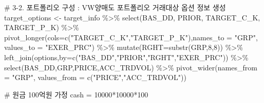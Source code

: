 \documentclass[
  a4paper,
  DIV=11,
  numbers=noendperiod]{scrreprt}
\newenvironment{Shaded}{\begin{snugshade}}{\end{snugshade}}
\newcommand{\AttributeTok}[1]{\textcolor[rgb]{0.40,0.45,0.13}{#1}}
\newcommand{\CommentTok}[1]{\textcolor[rgb]{0.37,0.37,0.37}{#1}}
\newcommand{\DecValTok}[1]{\textcolor[rgb]{0.68,0.00,0.00}{#1}}
\newcommand{\FunctionTok}[1]{\textcolor[rgb]{0.28,0.35,0.67}{#1}}
\newcommand{\NormalTok}[1]{\textcolor[rgb]{0.00,0.23,0.31}{#1}}
\newcommand{\OtherTok}[1]{\textcolor[rgb]{0.00,0.23,0.31}{#1}}
\newcommand{\SpecialCharTok}[1]{\textcolor[rgb]{0.37,0.37,0.37}{#1}}
\newcommand{\StringTok}[1]{\textcolor[rgb]{0.13,0.47,0.30}{#1}}
\begin{document}
\begin{Shaded}
\begin{Highlighting}[]
\CommentTok{\# 3{-}2. 포트폴리오 구성 : VW양매도 포트폴리오 거래대상 옵션 정보 생성}
\NormalTok{target\_options }\OtherTok{\textless{}{-}}\NormalTok{ target\_info }\SpecialCharTok{\%\textgreater{}\%} 
  \FunctionTok{select}\NormalTok{(BAS\_DD, PRIOR, TARGET\_C\_K, TARGET\_P\_K) }\SpecialCharTok{\%\textgreater{}\%} 
  \FunctionTok{pivot\_longer}\NormalTok{(}\AttributeTok{cols=}\FunctionTok{c}\NormalTok{(}\StringTok{"TARGET\_C\_K"}\NormalTok{,}\StringTok{"TARGET\_P\_K"}\NormalTok{),}\AttributeTok{names\_to =} \StringTok{"GRP"}\NormalTok{, }\AttributeTok{values\_to =} \StringTok{"EXER\_PRC"}\NormalTok{) }\SpecialCharTok{\%\textgreater{}\%} 
  \FunctionTok{mutate}\NormalTok{(}\AttributeTok{RGHT=}\FunctionTok{substr}\NormalTok{(GRP,}\DecValTok{8}\NormalTok{,}\DecValTok{8}\NormalTok{)) }\SpecialCharTok{\%\textgreater{}\%} 
  \FunctionTok{left\_join}\NormalTok{(options,}\AttributeTok{by=}\FunctionTok{c}\NormalTok{(}\StringTok{"BAS\_DD"}\NormalTok{,}\StringTok{"PRIOR"}\NormalTok{,}\StringTok{"RGHT"}\NormalTok{,}\StringTok{"EXER\_PRC"}\NormalTok{)) }\SpecialCharTok{\%\textgreater{}\%}
  \FunctionTok{select}\NormalTok{(BAS\_DD,GRP,PRICE,ACC\_TRDVOL) }\SpecialCharTok{\%\textgreater{}\%} 
  \FunctionTok{pivot\_wider}\NormalTok{(}\AttributeTok{names\_from =} \StringTok{"GRP"}\NormalTok{, }\AttributeTok{values\_from =} \FunctionTok{c}\NormalTok{(}\StringTok{"PRICE"}\NormalTok{,}\StringTok{"ACC\_TRDVOL"}\NormalTok{))}

\CommentTok{\# 원금 100억원 가정}
\NormalTok{cash }\OtherTok{=} \DecValTok{10000}\SpecialCharTok{*}\DecValTok{10000}\SpecialCharTok{*}\DecValTok{100}


\end{Highlighting}
\end{Shaded}
\end{document}
